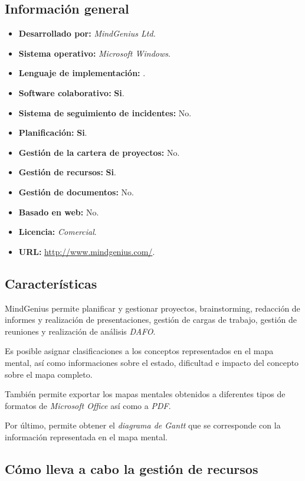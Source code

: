 \documentclass[11pt,a4paper,spanish,twoside]{report}
\begin{document}
  \subsection{Información general}
    \begin{itemize}
        \item\textbf{Desarrollado por:} \emph{MindGenius Ltd.}
	\item\textbf{Sistema operativo:} \emph{Microsoft Windows}.
	\item\textbf{Lenguaje de implementación:} .
        \item\textbf{Software colaborativo:} \textbf{Si}. 
        \item\textbf{Sistema de seguimiento de incidentes:} No. 
	\item\textbf{Planificación:} \textbf{Si}.
	\item\textbf{Gestión de la cartera de proyectos:} No.
	\item\textbf{Gestión de recursos:} \textbf{Si}.
	\item\textbf{Gestión de documentos:} No.
	\item\textbf{Basado en web:} No.
	\item\textbf{Licencia:} \emph{Comercial}.
	\item\textbf{URL:} \url{http://www.mindgenius.com/}.
	\end{itemize}
	\subsection{Características}

        MindGenius permite planificar y gestionar proyectos, brainstorming,
        redacción de informes y realización de presentaciones, gestión de
        cargas de trabajo, gestión de reuniones y realización de análisis
        \emph{DAFO}.

        Es posible asignar clasificaciones a los conceptos representados en
        el mapa mental, así como informaciones sobre el estado, dificultad e
        impacto del concepto sobre el mapa completo. 

        También permite exportar los mapas mentales obtenidos a diferentes
        tipos de formatos de \emph{Microsoft Office} así como a \emph{PDF}. 

        Por último, permite obtener el \emph{diagrama de Gantt} que se
        corresponde con la información representada en el mapa mental.

	\subsection{Cómo lleva a cabo la gestión de recursos}
\end{document}
